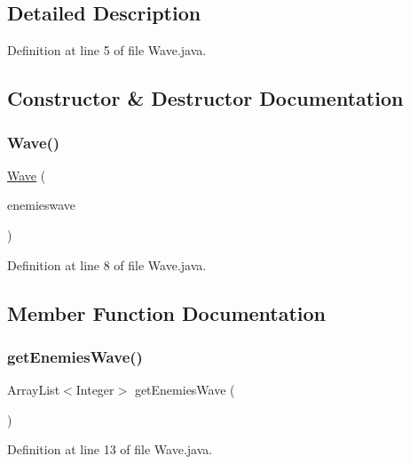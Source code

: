 \subsection{Detailed Description}


Definition at line 5 of file Wave.\+java.



\subsection{Constructor \& Destructor Documentation}
\mbox{\label{classevents_1_1_wave_a43d1aadca6968f6a8b718880fd19aaa4}} 
\subsubsection{\texorpdfstring{Wave()}{Wave()}}
{\footnotesize\ttfamily \hyperlink{classevents_1_1_wave}{Wave} (\begin{DoxyParamCaption}\item[{Array\+List$<$ Integer $>$}]{enemieswave }\end{DoxyParamCaption})}



Definition at line 8 of file Wave.\+java.



\subsection{Member Function Documentation}
\mbox{\label{classevents_1_1_wave_a196ea1965f3292364029770fc56b2dbc}} 
\subsubsection{\texorpdfstring{get\+Enemies\+Wave()}{getEnemiesWave()}}
{\footnotesize\ttfamily Array\+List$<$Integer$>$ get\+Enemies\+Wave (\begin{DoxyParamCaption}{ }\end{DoxyParamCaption})}



Definition at line 13 of file Wave.\+java.



